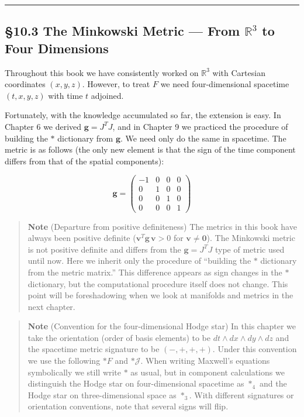 \begin{center}\rule{0.5\linewidth}{0.5pt}\end{center}

\hypertarget{the-minkowski-metric-from-mathbbr3-to-four-dimensions}{%
\subsection{\texorpdfstring{§10.3 The Minkowski Metric --- From
\(\mathbb{R}^3\) to Four
Dimensions}{§10.3 The Minkowski Metric --- From \textbackslash mathbb\{R\}\^{}3 to Four Dimensions}}\label{the-minkowski-metric-from-mathbbr3-to-four-dimensions}}

Throughout this book we have consistently worked on \(\mathbb{R}^3\)
with Cartesian coordinates \((x,y,z)\). However, to treat \(F\) we need
four-dimensional spacetime \((t,x,y,z)\) with time \(t\) adjoined.

Fortunately, with the knowledge accumulated so far, the extension is
easy. In Chapter 6 we derived \(\mathbf{g} = J^T J\), and in Chapter 9
we practiced the procedure of building the \(\ast\) dictionary from
\(\mathbf{g}\). We need only do the same in spacetime. The metric is as
follows (the only new element is that the sign of the time component
differs from that of the spatial components):

\[\mathbf{g} = \begin{pmatrix}
-1 & 0 & 0 & 0 \\
0 & 1 & 0 & 0 \\
0 & 0 & 1 & 0 \\
0 & 0 & 0 & 1
\end{pmatrix}\]

\begin{quote}
\textbf{Note} (Departure from positive definiteness) The metrics in this
book have always been positive definite
(\(\mathbf{v}^T\mathbf{g}\,\mathbf{v} > 0\) for
\(\mathbf{v}\neq\mathbf{0}\)). The Minkowski metric is not positive
definite and differs from the \(\mathbf{g}=J^T J\) type of metric used
until now. Here we inherit only the procedure of ``building the \(\ast\)
dictionary from the metric matrix.'' This difference appears as sign
changes in the \(\ast\) dictionary, but the computational procedure
itself does not change. This point will be foreshadowing when we look at
manifolds and metrics in the next chapter.
\end{quote}

\begin{quote}
\textbf{Note} (Convention for the four-dimensional Hodge star) In this
chapter we take the orientation (order of basis elements) to be
\(dt\wedge dx\wedge dy\wedge dz\) and the spacetime metric signature to
be \((-,+,+,+)\). Under this convention we use the following \(\ast F\)
and \(\ast\mathcal{J}\). When writing Maxwell's equations symbolically
we still write \(\ast\) as usual, but in component calculations we
distinguish the Hodge star on four-dimensional spacetime as \(\ast_4\)
and the Hodge star on three-dimensional space as \(\ast_3\). With
different signatures or orientation conventions, note that several signs
will flip.
\end{quote}

